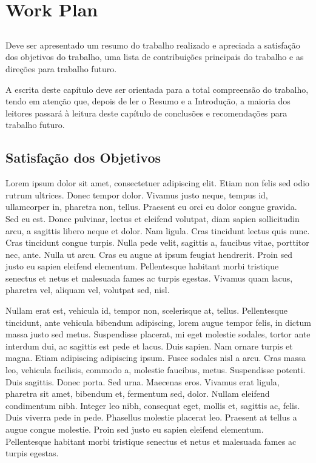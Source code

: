 \chapter{Work Plan} \label{chap:plan}

\section*{}

Deve ser apresentado um resumo do trabalho realizado e apreciada a
satisfação dos objetivos do trabalho, uma lista de contribuições
principais do trabalho e as direções para trabalho futuro.

A escrita deste capítulo deve ser orientada para a total compreensão
do trabalho, tendo em atenção que, depois de ler o Resumo e a
Introdução, a maioria dos leitores passará à leitura deste capítulo de
conclusões e recomendações para trabalho futuro.

\section{Satisfação dos Objetivos}

Lorem ipsum dolor sit amet, consectetuer adipiscing elit. Etiam non
felis sed odio rutrum ultrices. Donec tempor dolor. Vivamus justo
neque, tempus id, ullamcorper in, pharetra non, tellus. Praesent eu
orci eu dolor congue gravida. Sed eu est. Donec pulvinar, lectus et
eleifend volutpat, diam sapien sollicitudin arcu, a sagittis libero
neque et dolor. Nam ligula. Cras tincidunt lectus quis nunc. Cras
tincidunt congue turpis. Nulla pede velit, sagittis a, faucibus vitae,
porttitor nec, ante. Nulla ut arcu. Cras eu augue at ipsum feugiat
hendrerit. Proin sed justo eu sapien eleifend elementum. Pellentesque
habitant morbi tristique senectus et netus et malesuada fames ac
turpis egestas. Vivamus quam lacus, pharetra vel, aliquam vel,
volutpat sed, nisl. 

Nullam erat est, vehicula id, tempor non, scelerisque at,
tellus. Pellentesque tincidunt, ante vehicula bibendum adipiscing,
lorem augue tempor felis, in dictum massa justo sed metus. Suspendisse
placerat, mi eget molestie sodales, tortor ante interdum dui, ac
sagittis est pede et lacus. Duis sapien. Nam ornare turpis et
magna. Etiam adipiscing adipiscing ipsum. Fusce sodales nisl a
arcu. Cras massa leo, vehicula facilisis, commodo a, molestie
faucibus, metus. Suspendisse potenti. Duis sagittis. Donec porta. Sed
urna. Maecenas eros. Vivamus erat ligula, pharetra sit amet, bibendum
et, fermentum sed, dolor. Nullam eleifend condimentum nibh. Integer
leo nibh, consequat eget, mollis et, sagittis ac, felis. Duis viverra
pede in pede. Phasellus molestie placerat leo. Praesent at tellus a
augue congue molestie. Proin sed justo eu sapien eleifend
elementum. Pellentesque habitant morbi tristique senectus et netus et
malesuada fames ac turpis egestas. 

